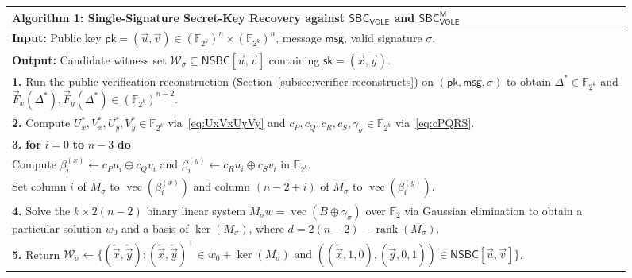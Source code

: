 \documentclass[11pt,a4paper]{article}
\theoremstyle{definition}
\theoremstyle{remark}
\newcommand{\Ftwo}{\mathbb{F}_2}
\newcommand{\Ftwok}{\mathbb{F}_{2^k}}
\newcommand{\NSBC}{\mathsf{NSBC}}
\newcommand{\SBCVOLE}{\mathsf{SBC}_{\mathsf{VOLE}}}
\newcommand{\SBCVOLEM}{\mathsf{SBC}_{\mathsf{VOLE}}^{\mathsf{M}}}
\newcommand{\pk}{\mathsf{pk}}
\newcommand{\sk}{\mathsf{sk}}
\newcommand{\msg}{\mathsf{msg}}
\newcommand{\rank}{\operatorname{rank}}
\newcommand{\vecF}{\operatorname{vec}}
\begin{document}
\begin{figure}[t]
\centering
\small
\begin{tabular}{@{}p{}@{}}
\toprule
\textbf{Algorithm 1:} Single-Signature Secret-Key Recovery against $\SBCVOLE$ and $\SBCVOLEM$ \\
\midrule
\textbf{Input:} Public key $\pk = (\vec{u}, \vec{v}) \in (\Ftwok)^n \times (\Ftwok)^n$, message $\msg$, valid signature $\sigma$. \\
\textbf{Output:} Candidate witness set $\mathcal{W}_\sigma \subseteq \NSBC[\vec{u}, \vec{v}]$ containing $\sk = (\vec{x}, \vec{y})$. \\[2pt]
\textbf{1.} Run the public verification reconstruction (Section~\ref{subsec:verifier-reconstructs}) on $(\pk, \msg, \sigma)$ to obtain $\Delta^* \in \Ftwok$ and $\vec{F}_x(\Delta^*), \vec{F}_y(\Delta^*) \in (\Ftwok)^{n-2}$. \\
\textbf{2.} Compute $U_x^*, V_x^*, U_y^*, V_y^* \in \Ftwok$ via~\eqref{eq:UxVxUyVy} and $c_P, c_Q, c_R, c_S, \gamma_\sigma \in \Ftwok$ via~\eqref{eq:cPQRS}. \\
\textbf{3.} \textbf{for} $i = 0$ \textbf{to} $n - 3$ \textbf{do} \\
\hspace*{1.8em} Compute $\beta_i^{(x)} \leftarrow c_P u_i \oplus c_Q v_i$ and $\beta_i^{(y)} \leftarrow c_R u_i \oplus c_S v_i$ in $\Ftwok$. \\
\hspace*{1.8em} Set column $i$ of $M_\sigma$ to $\vecF(\beta_i^{(x)})$ and column $(n - 2 + i)$ of $M_\sigma$ to $\vecF(\beta_i^{(y)})$. \\
\textbf{4.} Solve the $k \times 2(n-2)$ binary linear system $M_\sigma w = \vecF(B \oplus \gamma_\sigma)$ over $\Ftwo$ via Gaussian elimination to obtain a particular solution $w_0$ and a basis of $\ker(M_\sigma)$, where $d = 2(n-2) - \rank(M_\sigma)$. \\
\textbf{5.} Return $\mathcal{W}_\sigma \leftarrow \big\{(\tilde{\vec{x}}, \tilde{\vec{y}}) : (\tilde{\vec{x}}, \tilde{\vec{y}})^\top \in w_0 + \ker(M_\sigma) \text{ and } ((\tilde{\vec{x}}, 1, 0), (\tilde{\vec{y}}, 0, 1)) \in \NSBC[\vec{u}, \vec{v}]\big\}$. \\
\bottomrule
\end{tabular}
\end{figure}
\end{document}
